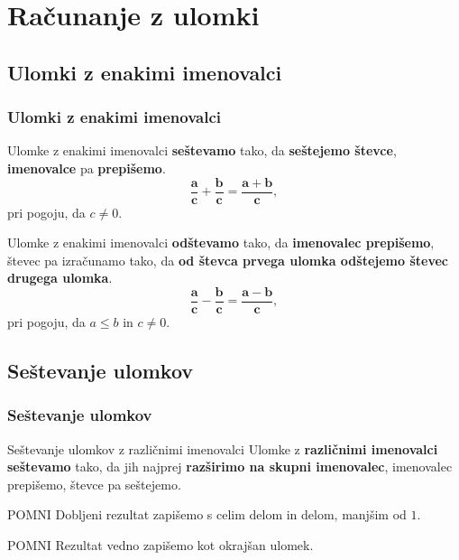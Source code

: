 \section{Računanje z ulomki}

\begin{frame}
    \sectionpage
\end{frame}

\begin{frame}
\end{frame}

    \subsection{Ulomki z enakimi imenovalci}

        \begin{frame}[t]
            \frametitle{Ulomki z enakimi imenovalci}

            \begin{alertblock}{}
                Ulomke z enakimi imenovalci \textbf{seštevamo} tako, da \textbf{seštejemo števce}, \textbf{imenovalce} pa \textbf{prepišemo}.
                $$ \mathbf{\frac{a}{c}+\frac{b}{c}=\frac{a+b}{c}}, $$ pri pogoju, da $c\neq 0$.

                Ulomke z enakimi imenovalci \textbf{odštevamo} tako, da \textbf{imenovalec prepišemo}, števec pa izračunamo tako, da \textbf{od števca prvega ulomka odštejemo števec drugega ulomka}.
                $$ \mathbf{\frac{a}{c}-\frac{b}{c}=\frac{a-b}{c}}, $$ pri pogoju, da $a\leq b$ in $c\neq 0$.
            \end{alertblock}
        \end{frame}

    \subsection{Seštevanje ulomkov}

        \begin{frame}[t]
            \frametitle{Seštevanje ulomkov}

            \begin{alertblock}{Seštevanje ulomkov z različnimi imenovalci}
                Ulomke z \textbf{različnimi imenovalci seštevamo} tako, da jih najprej \textbf{razširimo na skupni imenovalec}, imenovalec prepišemo, števce pa seštejemo.
            \end{alertblock}

            \begin{block}{POMNI}
                Dobljeni rezultat zapišemo s celim delom in delom, manjšim od $1$.
            \end{block}

            \begin{block}{POMNI}
                Rezultat vedno zapišemo kot okrajšan ulomek.
            \end{block}

        \end{frame}

